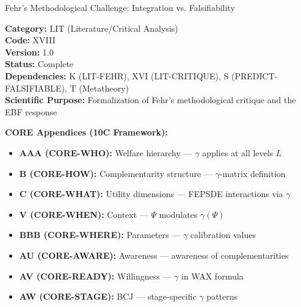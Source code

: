 
\begin{chapter}{Fehr's Methodological Challenge: Integration vs. Falsifiability}
\label{app:lit-fehr-method}

\begin{tcolorbox}[colback=gray!5!white,colframe=gray!75!black]
\small
\textbf{Category:} LIT (Literature/Critical Analysis) \\
\textbf{Code:} XVIII \\
\textbf{Version:} 1.0 \\
\textbf{Status:} Complete \\
\textbf{Dependencies:} K (LIT-FEHR), XVI (LIT-CRITIQUE), S (PREDICT-FALSIFIABLE), T (Metatheory) \\
\textbf{Scientific Purpose:} Formalization of Fehr's methodological critique and the EBF response
\end{tcolorbox}

\begin{tcolorbox}[colback=blue!5!white,colframe=blue!75!black,title=\textbf{Cross-Reference Map}]
\small

\textbf{CORE Appendices (10C Framework):}
\begin{itemize}[noitemsep]
    \item \textbf{AAA (CORE-WHO):} Welfare hierarchy --- $\gamma$ applies at all levels $L$
    \item \textbf{B (CORE-HOW):} Complementarity structure --- $\gamma$-matrix definition
    \item \textbf{C (CORE-WHAT):} Utility dimensions --- FEPSDE interactions via $\gamma$
    \item \textbf{V (CORE-WHEN):} Context --- $\Psi$ modulates $\gamma(\Psi)$
    \item \textbf{BBB (CORE-WHERE):} Parameters --- $\gamma$ calibration values
    \item \textbf{AU (CORE-AWARE):} Awareness --- awareness of complementarities
    \item \textbf{AV (CORE-READY):} Willingness --- $\gamma$ in WAX formula
    \item \textbf{AW (CORE-STAGE):} BCJ --- stage-specific $\gamma$ patterns
\end{itemize}


\end{tcolorbox}
\end{chapter}

